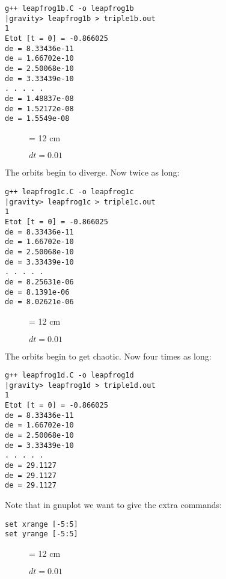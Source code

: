 

\begin{verbatim}
g++ leapfrog1b.C -o leapfrog1b
|gravity> leapfrog1b > triple1b.out
1
Etot [t = 0] = -0.866025
de = 8.33436e-11
de = 1.66702e-10
de = 2.50068e-10
de = 3.33439e-10
. . . . .
de = 1.48837e-08
de = 1.52172e-08
de = 1.5549e-08
\end{verbatim}

\begin{figure}
\begin{center}
\leavevmode
\epsfxsize = 12 cm
\caption{$dt = 0.01$}
\label{fig:triple1b}
\end{center}
\end{figure}

The orbits begin to diverge.
Now twice as long:



\begin{verbatim}
g++ leapfrog1c.C -o leapfrog1c
|gravity> leapfrog1c > triple1c.out
1
Etot [t = 0] = -0.866025
de = 8.33436e-11
de = 1.66702e-10
de = 2.50068e-10
de = 3.33439e-10
. . . . .
de = 8.25631e-06
de = 8.1391e-06
de = 8.02621e-06
\end{verbatim}

\begin{figure}
\begin{center}
\leavevmode
\epsfxsize = 12 cm
\caption{$dt = 0.01$}
\label{fig:triple1c}
\end{center}
\end{figure}

The orbits begin to get chaotic.
Now four times as long:



\begin{verbatim}
g++ leapfrog1d.C -o leapfrog1d
|gravity> leapfrog1d > triple1d.out
1
Etot [t = 0] = -0.866025
de = 8.33436e-11
de = 1.66702e-10
de = 2.50068e-10
de = 3.33439e-10
. . . . .
de = 29.1127
de = 29.1127
de = 29.1127
\end{verbatim}

Note that in gnuplot we want to give the extra commands:

\begin{verbatim}
set xrange [-5:5]
set yrange [-5:5]
\end{verbatim}

\begin{figure}
\begin{center}
\leavevmode
\epsfxsize = 12 cm
\caption{$dt = 0.01$}
\label{fig:triple1d}
\end{center}
\end{figure}

